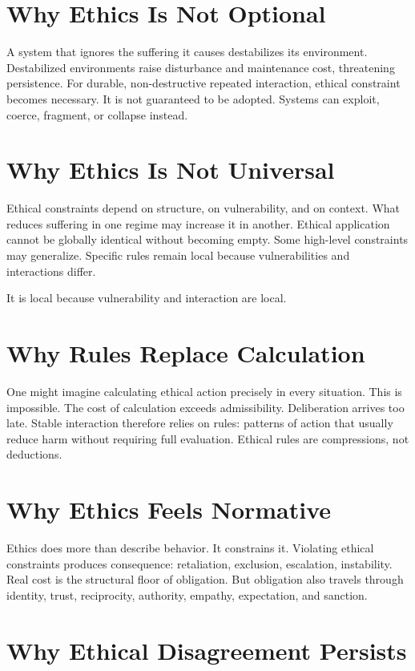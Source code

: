 \documentclass[11pt,twoside,openright]{book}
\begin{document}
\section*{Why Ethics Is Not Optional}

A system that ignores the suffering it causes destabilizes its environment. Destabilized environments raise disturbance and maintenance cost, threatening persistence. For durable, non-destructive repeated interaction, ethical constraint becomes necessary. It is not guaranteed to be adopted. Systems can exploit, coerce, fragment, or collapse instead.

\section*{Why Ethics Is Not Universal}

Ethical constraints depend on structure, on vulnerability, and on context. What reduces suffering in one regime may increase it in another. Ethical application cannot be globally identical without becoming empty. Some high-level constraints may generalize. Specific rules remain local because vulnerabilities and interactions differ.

It is local because vulnerability and interaction are local.

\section*{Why Rules Replace Calculation}

One might imagine calculating ethical action precisely in every situation. This is impossible. The cost of calculation exceeds admissibility. Deliberation arrives too late. Stable interaction therefore relies on rules: patterns of action that usually reduce harm without requiring full evaluation. Ethical rules are compressions, not deductions.

\section*{Why Ethics Feels Normative}

Ethics does more than describe behavior. It constrains it. Violating ethical constraints produces consequence: retaliation, exclusion, escalation, instability. Real cost is the structural floor of obligation. But obligation also travels through identity, trust, reciprocity, authority, empathy, expectation, and sanction.

\section*{Why Ethical Disagreement Persists}
\end{document}
